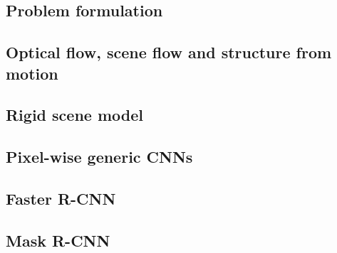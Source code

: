
\subsection{Problem formulation}
\subsection{Optical flow, scene flow and structure from motion}
\subsection{Rigid scene model}
\subsection{Pixel-wise generic CNNs}
\subsection{Faster R-CNN}
\subsection{Mask R-CNN}
